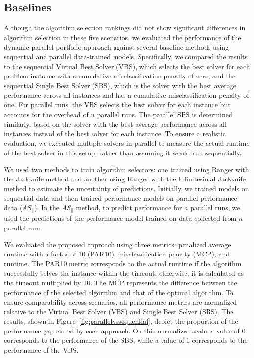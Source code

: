 \subsection{Baselines}

Although the algorithm selection rankings did not show significant differences in algorithm selection in these five scenarios, we evaluated the performance of the dynamic parallel portfolio approach against several baseline methods using sequential and parallel data-trained models. Specifically, we compared the results to the sequential Virtual Best Solver (VBS), which selects the best solver for each problem instance with a cumulative misclassification penalty of zero, and the sequential Single Best Solver (SBS), which is the solver with the best average performance across all instances and has a cumulative misclassification penalty of one. For parallel runs, the VBS selects the best solver for each instance but accounts for the overhead of $n$ parallel runs. The parallel SBS is determined similarly, based on the solver with the best average performance across all instances instead of the best solver for each instance. To ensure a realistic evaluation, we executed multiple solvers in parallel to measure the actual runtime of the best solver in this setup, rather than assuming it would run sequentially.

We used two methods to train algorithm selectors: one trained using Ranger with the Jackknife method and another using Ranger with the Infinitesimal Jackknife method to estimate the uncertainty of predictions. Initially, we trained models on sequential data and then trained performance models on parallel performance data ($AS_{\parallel}$). In the $AS_{\parallel}$ method, to predict performance for $n$ parallel runs, we used the predictions of the performance model trained on data collected from $n$ parallel runs.

We evaluated the proposed approach using three metrics: penalized average runtime with a factor of 10 (PAR10), misclassification penalty (MCP), and runtime. The PAR10 metric corresponds to the actual runtime if the algorithm successfully solves the instance within the timeout; otherwise, it is calculated as the timeout multiplied by 10. The MCP represents the difference between the performance of the selected algorithm and that of the optimal algorithm. To ensure comparability across scenarios, all performance metrics are normalized relative to the Virtual Best Solver (VBS) and Single Best Solver (SBS). The results, shown in Figure~\ref{fig:parallelvssequential}, depict the proportion of the performance gap closed by each approach. On this normalized scale, a value of 0 corresponds to the performance of the SBS, while a value of 1 corresponds to the performance of the VBS.

